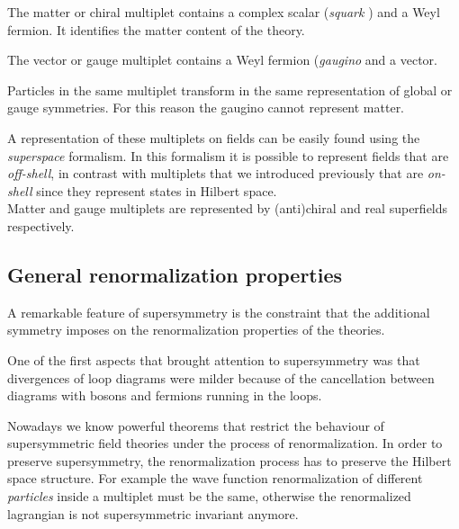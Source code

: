 The matter or chiral multiplet contains a complex scalar (\emph{squark} ) and a Weyl fermion. It identifies the matter content of the theory.

The vector or gauge multiplet contains a Weyl fermion (\emph{gaugino} and a vector.

Particles in the same multiplet transform in the same representation of global or gauge symmetries. For this reason the gaugino cannot represent matter.


A representation of these multiplets on fields can be easily found using the \emph{superspace} formalism.
In this formalism it is possible to represent fields  that are \emph{off-shell}, in contrast with multiplets that we introduced previously that are \emph{on-shell} since they represent states in Hilbert space.\\
Matter and gauge multiplets are represented by (anti)chiral and real superfields respectively.



\subsection{General renormalization properties}

A remarkable feature of supersymmetry is the constraint that the additional symmetry imposes on the renormalization properties of the theories.

One of the first aspects that brought attention to supersymmetry was that divergences of loop diagrams were milder because of the cancellation between diagrams with bosons and fermions running in the loops. 

Nowadays we know powerful theorems that restrict the behaviour of supersymmetric field theories under the process of renormalization.
In order to preserve supersymmetry, the renormalization process has to preserve the Hilbert space structure. For example the wave function renormalization of different \emph{ particles} inside a multiplet must be the same, otherwise the renormalized lagrangian is not supersymmetric invariant anymore. 

